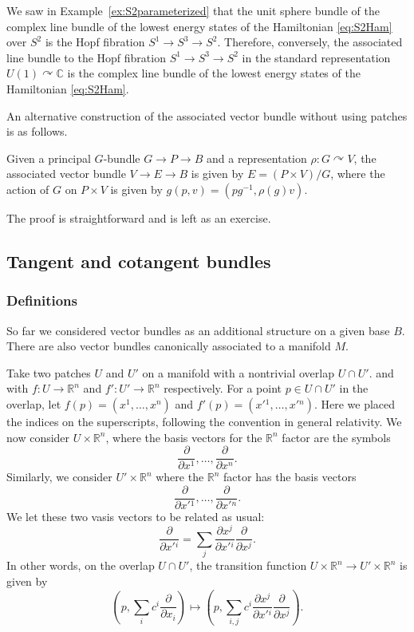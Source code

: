 \documentclass[12pt]{article}
\numberwithin{equation}{section}
\numberwithin{figure}{section}
\theoremstyle{remark}
\def\bC{\mathbb{C}}
\def\bR{\mathbb{R}}
\begin{document}
We saw in Example~\ref{ex:S2parameterized} that the unit sphere bundle
of the complex line bundle of the lowest energy states of the Hamiltonian \eqref{eq:S2Ham}
over $S^2$ is the Hopf fibration $S^1\to S^3\to S^2$.
Therefore, conversely, the associated line bundle
to the Hopf fibration $S^1\to S^3\to S^2$ 
in the standard representation $U(1)\curvearrowright \bC$
is the complex line bundle of the lowest energy states of the Hamiltonian \eqref{eq:S2Ham}.

An alternative construction of the associated vector bundle 
without using patches is as follows. 
\begin{proposition}
  Given a principal $G$-bundle $G\to P\to B$ and a representation $\rho: G\curvearrowright V$,
  the associated vector bundle $V\to E\to B$ is given by
  $E= (P \times V)/G$,
  where the action of $G$ on $P\times V$ is given by $g(p,v)=(pg^{-1},\rho(g)v)$.
\end{proposition}
The proof is straightforward and is left as an exercise.

\subsection{Tangent and cotangent bundles}

\subsubsection{Definitions}
So far we considered vector bundles as an additional structure on a given base $B$.
There are also vector bundles canonically associated to a manifold $M$.

Take two patches $U$ and $U'$ on a manifold
with a nontrivial overlap $U\cap U'$.
and with $f:U\to \bR^n$ and $f':U'\to \bR^n$ respectively.
For a point $p\in U\cap U'$ in the overlap,
let $f(p)=(x^1,\ldots,x^n)$ and $f'(p)=(x'{}^1,\ldots,x'{}^n)$.
Here we placed the indices on the superscripts, following the convention in general relativity.
We now consider $U\times \bR^n$,
where the basis vectors for the $\bR^n$ factor
are the symbols
\begin{equation}
\frac{\partial}{\partial x^1},\ldots,\frac{\partial}{\partial x^n}.
\end{equation}
Similarly, we consider $U'\times \bR^n$
where the $\bR^n$ factor has the basis vectors
\begin{equation}
\frac{\partial}{\partial x'{}^1},\ldots,\frac{\partial}{\partial x'{}^n}.
\end{equation}
We let these two vasis vectors to be related as usual:
\begin{equation}
\frac{\partial}{\partial x'{}^i} = \sum_{j}\frac{\partial x^j}{\partial x'{}^i} \frac{\partial}{\partial x^j}.
\label{eq:contravariant}
\end{equation}
In other words, on the overlap $U\cap U'$,
the transition function $U\times \bR^n \to U'\times \bR^n$ is given by 
\begin{equation}
  (p,\sum_i c^i\frac{\partial}{\partial x_i} )
  \mapsto 
  (p, \sum_{i,j} c^i \frac{\partial x^j}{\partial x'{}^i} \frac{\partial}{\partial x^j}).
\end{equation}
\end{document}
